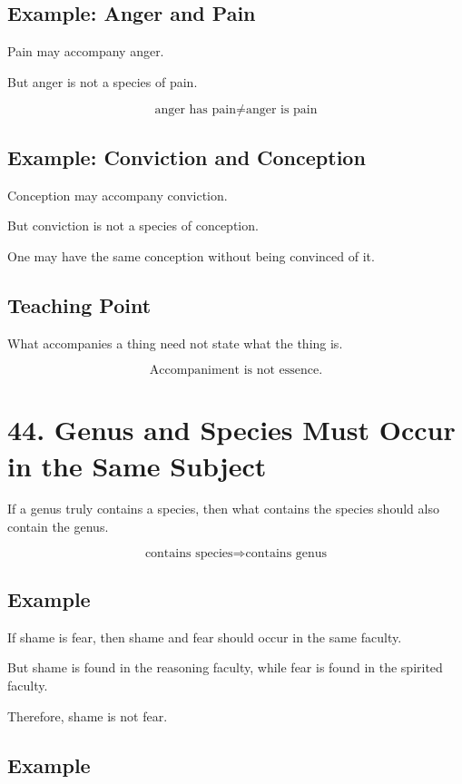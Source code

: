\documentclass[12pt]{article}
\begin{document}
\subsection*{Example: Anger and Pain}

Pain may accompany anger.

But anger is not a species of pain.

\[
\text{anger has pain} \neq \text{anger is pain}
\]

\subsection*{Example: Conviction and Conception}

Conception may accompany conviction.

But conviction is not a species of conception.

One may have the same conception without being convinced of it.

\subsection*{Teaching Point}

What accompanies a thing need not state what the thing is.

\[
\boxed{
\text{Accompaniment is not essence.}
}
\]

\section*{44. Genus and Species Must Occur in the Same Subject}

If a genus truly contains a species, then what contains the species should also
contain the genus.

\[
\text{contains species} \Rightarrow \text{contains genus}
\]

\subsection*{Example}

If shame is fear, then shame and fear should occur in the same faculty.

But shame is found in the reasoning faculty, while fear is found in the spirited
faculty.

Therefore, shame is not fear.

\subsection*{Example}
\end{document}
